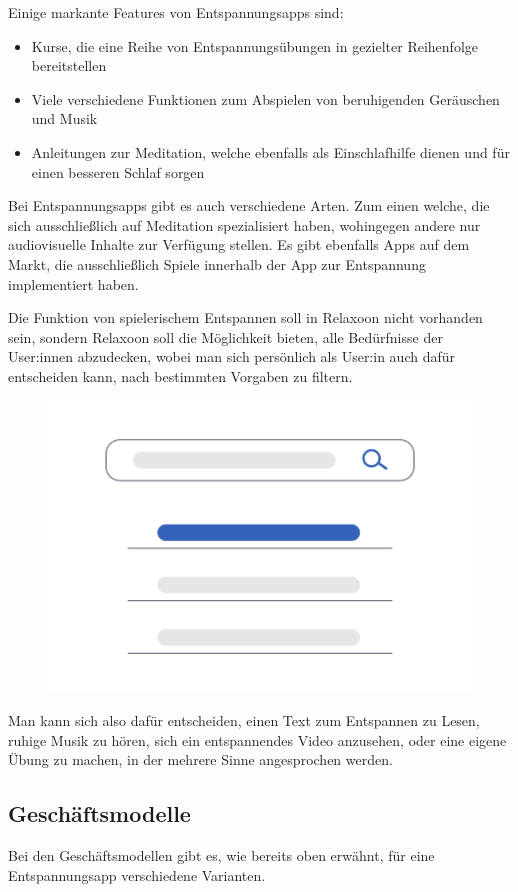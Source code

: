 Einige markante Features von Entspannungsapps sind:

\begin{itemize}
    \item Kurse, die eine Reihe von Entspannungsübungen in gezielter Reihenfolge bereitstellen
    \item Viele verschiedene Funktionen zum Abspielen von beruhigenden Geräuschen und Musik
    \item Anleitungen zur Meditation, welche ebenfalls als Einschlafhilfe dienen und für einen besseren Schlaf sorgen
\end{itemize}

Bei Entspannungsapps gibt es auch verschiedene Arten. Zum einen welche, die sich ausschließlich auf Meditation
spezialisiert haben, wohingegen andere nur audiovisuelle Inhalte zur Verfügung stellen. Es gibt ebenfalls Apps auf
dem Markt, die ausschließlich Spiele innerhalb der App zur Entspannung implementiert haben. 

Die Funktion von spielerischem Entspannen soll in Relaxoon nicht vorhanden sein, sondern Relaxoon soll
die Möglichkeit bieten, alle Bedürfnisse der User:innen abzudecken, wobei man sich persönlich als User:in 
auch dafür entscheiden kann, nach bestimmten Vorgaben zu filtern.

\begin{figure}[H]
    \centering
    \includegraphics[height=0.35\textwidth]{./pics/undraw_Search_re_x5gq.png}
    \caption{}
\end{figure}

Man kann sich also dafür entscheiden, einen Text
zum Entspannen zu Lesen, ruhige Musik zu hören, sich ein entspannendes Video anzusehen, oder eine eigene Übung
zu machen, in der mehrere Sinne angesprochen werden.

\subsection{Geschäftsmodelle}

Bei den Geschäftsmodellen gibt es, wie bereits oben erwähnt, für eine Entspannungsapp verschiedene Varianten. 


